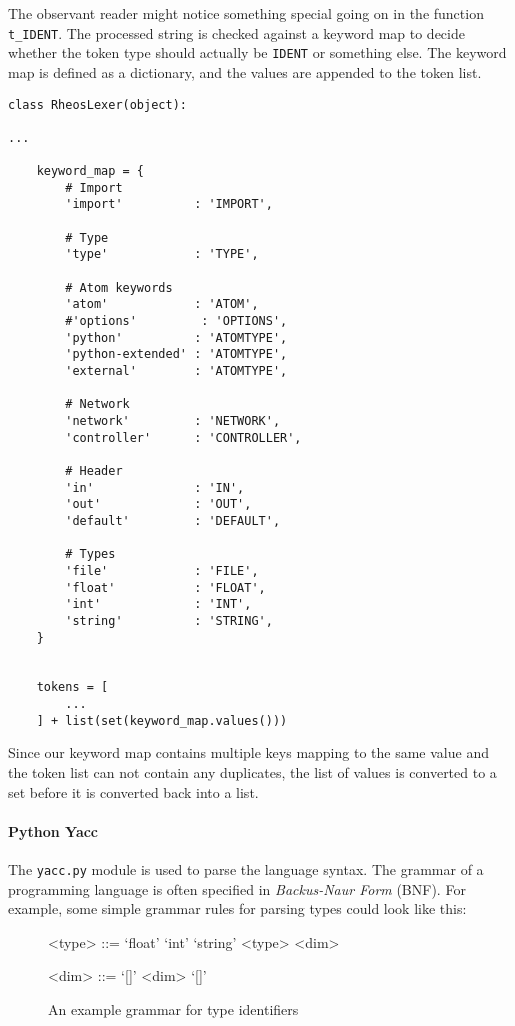 The observant reader might notice something special going on in the
function \texttt{t_IDENT}. The processed string is checked against a
keyword map to decide whether the token type should actually be
\texttt{IDENT} or something else. The keyword map is defined as a
dictionary, and the values are appended to the token list.

\begin{lstlisting}
class RheosLexer(object):

...

    keyword_map = {
        # Import
        'import'          : 'IMPORT',

        # Type
        'type'            : 'TYPE',

        # Atom keywords
        'atom'            : 'ATOM',
        #'options'         : 'OPTIONS',
        'python'          : 'ATOMTYPE',
        'python-extended' : 'ATOMTYPE',
        'external'        : 'ATOMTYPE',

        # Network
        'network'         : 'NETWORK',
        'controller'      : 'CONTROLLER',
                
        # Header
        'in'              : 'IN',
        'out'             : 'OUT',
        'default'         : 'DEFAULT',
        
        # Types
        'file'            : 'FILE',
        'float'           : 'FLOAT',
        'int'             : 'INT',
        'string'          : 'STRING',
    }


    tokens = [
        ...
    ] + list(set(keyword_map.values()))
\end{lstlisting}

\noindent Since our keyword map contains multiple keys mapping to the
same value and the token list can not contain any duplicates, the list
of values is converted to a set before it is converted back into a
list.


\paragraph{Python Yacc}

The \texttt{yacc.py} module is used to parse the language syntax. The
grammar of a programming language is often specified
in \emph{Backus-Naur Form} (BNF). For example, some simple grammar
rules for parsing types could look like this:

\begin{figure}[h!]
  \begin{grammar} <type> ::= `float' \alt `int' \alt `string' \alt
    <type> <dim>

    <dim> ::= `[]'
    \alt <dim> `[]'
  \end{grammar}
  \caption{An example grammar for type identifiers}
  \label{grammar:typeex}
\end{figure}

